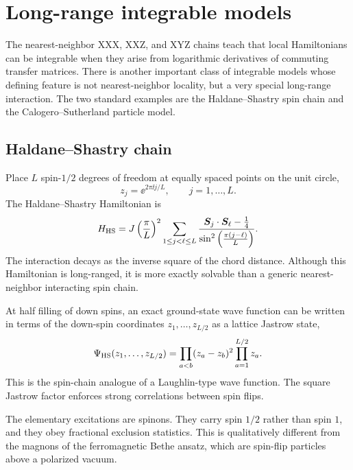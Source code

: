 \section{Long-range integrable models}
\label{sec:further-long-range-integrable-models}

The nearest-neighbor XXX, XXZ, and XYZ chains teach that local Hamiltonians can
be integrable when they arise from logarithmic derivatives of commuting transfer
matrices.  There is another important class of integrable models whose defining
feature is not nearest-neighbor locality, but a very special long-range
interaction.  The two standard examples are the Haldane--Shastry spin chain and
the Calogero--Sutherland particle model.

\subsection{Haldane--Shastry chain}
\label{subsec:further-haldane-shastry}

Place $L$ spin-$1/2$ degrees of freedom at equally spaced points on the unit
circle,
\begin{equation}
\label{eq:further-hs-roots-of-unity}
    z_j=\ee^{2\pi\ii j/L},
    \qquad
    j=1,\ldots,L .
\end{equation}
The Haldane--Shastry Hamiltonian is
\begin{equation}
\label{eq:further-haldane-shastry-hamiltonian}
    H_{\rm HS}
    =
    J\left(\frac{\pi}{L}\right)^2
    \sum_{1\leq j<\ell\leq L}
    \frac{\bm{S}_j\cdot\bm{S}_\ell-\frac14}
         {\sin^2\left(\frac{\pi(j-\ell)}{L}\right)} .
\end{equation}
The interaction decays as the inverse square of the chord distance.  Although
this Hamiltonian is long-ranged, it is more exactly solvable than a generic
nearest-neighbor interacting spin chain.

At half filling of down spins, an exact ground-state wave function can be written
in terms of the down-spin coordinates $z_1,\ldots,z_{L/2}$ as a lattice Jastrow
state,
\begin{equation}
\label{eq:further-hs-ground-state}
    \Psi_{\rm HS}(z_1,\ldots,z_{L/2})
    =
    \prod_{a<b}(z_a-z_b)^2
    \prod_{a=1}^{L/2} z_a .
\end{equation}
This is the spin-chain analogue of a Laughlin-type wave function.  The square
Jastrow factor enforces strong correlations between spin flips.

The elementary excitations are spinons.  They carry spin $1/2$ rather than spin
$1$, and they obey fractional exclusion statistics.  This is qualitatively
different from the magnons of the ferromagnetic Bethe ansatz, which are spin-flip
particles above a polarized vacuum.

